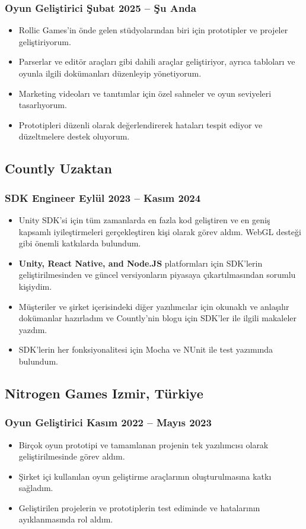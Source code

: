\documentclass[11pt]{article}
\newcommand{\rside}[1]{
  \hfill {\normalfont\color{accent} #1}%
}
\begin{document}
\subsubsection{Oyun Geliştirici \rside{Şubat 2025 -- Şu Anda}}
\begin{itemize}
  \item Rollic Games'in önde gelen stüdyolarından biri için prototipler ve projeler geliştiriyorum.
  \item Parserlar ve editör araçları gibi dahili araçlar geliştiriyor, ayrıca tabloları ve oyunla ilgili dokümanları düzenleyip yönetiyorum.
  \item Marketing videoları ve tanıtımlar için özel sahneler ve oyun seviyeleri tasarlıyorum.
  \item Prototipleri düzenli olarak değerlendirerek hataları tespit ediyor ve düzeltmelere destek oluyorum.
\end{itemize}

\subsection{Countly \rside{Uzaktan}}
\subsubsection{SDK Engineer \rside{Eylül 2023 -- Kasım 2024}}
\begin{itemize}
  \item Unity SDK'si için tüm zamanlarda en fazla kod geliştiren ve en geniş kapsamlı iyileştirmeleri gerçekleştiren kişi olarak görev aldım. WebGL desteği gibi önemli katkılarda bulundum.
  \item \textbf{Unity, React Native, and Node.JS} platformları için SDK'lerin geliştirilmesinden ve güncel versiyonların piyasaya çıkartılmasından sorumlu kişiydim.
  \item Müşteriler ve şirket içerisindeki diğer yazılımcılar için okunaklı ve anlaşılır dokümanlar hazırladım ve Countly'nin blogu için SDK'ler ile ilgili makaleler yazdım.
  \item SDK'lerin her fonksiyonalitesi için Mocha ve NUnit ile test yazımında bulundum.
\end{itemize}

\subsection{Nitrogen Games \rside{Izmir, Türkiye}}
\subsubsection{Oyun Geliştirici \rside{Kasım 2022 -- Mayıs 2023}}
\begin{itemize}
  \item Birçok oyun prototipi ve tamamlanan projenin tek yazılımcısı olarak geliştirilmesinde görev aldım.
  \item Şirket içi kullanılan oyun geliştirme araçlarının oluşturulmasına katkı sağladım.
  \item Geliştirilen projelerin ve prototiplerin test ediminde ve hatalarının ayıklanmasında rol aldım.
\end{itemize}
\end{document}
